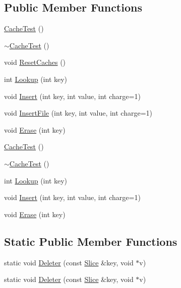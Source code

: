\subsection*{Public Member Functions}
\begin{DoxyCompactItemize}
\item 
\hyperlink{classleveldb_1_1_cache_test_abfea0e2ae3ee11b62d1f6b622ef47334}{Cache\+Test} ()
\item 
\hyperlink{classleveldb_1_1_cache_test_a2591fd9f81069e507206aef8f4d91660}{$\sim$\+Cache\+Test} ()
\item 
void \hyperlink{classleveldb_1_1_cache_test_a6c1a40014395d10702c0509506e4f296}{Reset\+Caches} ()
\item 
int \hyperlink{classleveldb_1_1_cache_test_a90d19cd6098f10f809f0c3b94e8b3fc6}{Lookup} (int key)
\item 
void \hyperlink{classleveldb_1_1_cache_test_ad7fc76253a92137e62aede17322c7286}{Insert} (int key, int value, int charge=1)
\item 
void \hyperlink{classleveldb_1_1_cache_test_a826135ab4dce1e11bbb99c60e817eafe}{Insert\+File} (int key, int value, int charge=1)
\item 
void \hyperlink{classleveldb_1_1_cache_test_aeaa81bbd9d0fba1fb31b0a8f7aa94397}{Erase} (int key)
\item 
\hyperlink{classleveldb_1_1_cache_test_abfea0e2ae3ee11b62d1f6b622ef47334}{Cache\+Test} ()
\item 
\hyperlink{classleveldb_1_1_cache_test_a2591fd9f81069e507206aef8f4d91660}{$\sim$\+Cache\+Test} ()
\item 
int \hyperlink{classleveldb_1_1_cache_test_a90d19cd6098f10f809f0c3b94e8b3fc6}{Lookup} (int key)
\item 
void \hyperlink{classleveldb_1_1_cache_test_ad7fc76253a92137e62aede17322c7286}{Insert} (int key, int value, int charge=1)
\item 
void \hyperlink{classleveldb_1_1_cache_test_aeaa81bbd9d0fba1fb31b0a8f7aa94397}{Erase} (int key)
\end{DoxyCompactItemize}
\subsection*{Static Public Member Functions}
\begin{DoxyCompactItemize}
\item 
static void \hyperlink{classleveldb_1_1_cache_test_aa8d3ce31a1995da33810f2b5320089ab}{Deleter} (const \hyperlink{classleveldb_1_1_slice}{Slice} \&key, void $\ast$v)
\item 
static void \hyperlink{classleveldb_1_1_cache_test_aa8d3ce31a1995da33810f2b5320089ab}{Deleter} (const \hyperlink{classleveldb_1_1_slice}{Slice} \&key, void $\ast$v)
\end{DoxyCompactItemize}
